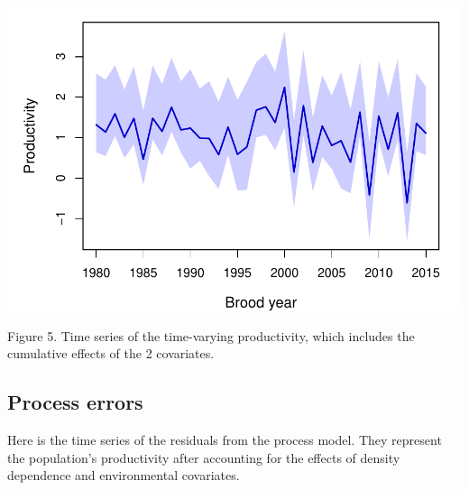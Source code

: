 \documentclass[11pt,]{article}
\begin{document}
\includegraphics{App_3_Summarize_results_files/figure-latex/plot_prod_over_time-1.pdf}

Figure 5. Time series of the time-varying productivity, which includes
the cumulative effects of the 2 covariates.

\subsection{Process errors}\label{process-errors}

Here is the time series of the residuals from the process model. They
represent the population's productivity after accounting for the effects
of density dependence and environmental covariates.
\end{document}
